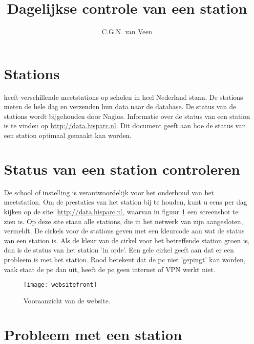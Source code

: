 



\title{Dagelijkse controle van een station} \author{C.G.N. van Veen}
\date{}

\maketitle

\section{Stations}

\hisparc heeft verschillende meetstations op scholen in heel Nederland
staan. De stations meten de hele dag en verzenden hun data naar de \hisparc database. 
De status van de \hisparc stations wordt bijgehouden door Nagios. 
Informatie over de status van een station is te vinden op \url{http://data.hisparc.nl}. 
Dit document geeft aan hoe de status van een station optimaal gemaakt kan worden.

\section{Status van een station controleren}

De school of instelling is verantwoordelijk voor het onderhoud van het meetstation. 
Om de prestaties van het station bij te houden, kunt u eens per dag kijken op
de site: \url{http://data.hisparc.nl}, waarvan in figuur
\ref{fig:frontweb} een screenshot te zien is. Op deze site staan alle
stations, die in het netwerk van \hisparc zijn aangesloten, vermeldt. De
cirkels voor de stations geven met een kleurcode aan wat de status van
een station is. Als de kleur van de cirkel voor het betreffende station
groen is, dan is de status van het station 'in orde'. Een gele cirkel
geeft aan dat er een probleem is met het station. Rood betekent dat de pc
niet 'gepingt' kan worden, vaak staat de pc dan uit, heeft de pc geen internet of VPN werkt niet.

\begin{figure} \centering \texttt{[image: websitefront]}
\caption{Vooraanzicht van de \hisparc website.} \label{fig:frontweb}
\end{figure}

\section{Probleem met een station}

